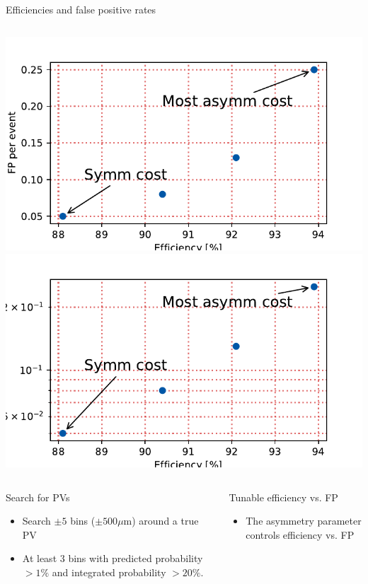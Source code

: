 \begin{frame}{Efficiencies and false positive rates}
\begin{columns}
\includegraphics[width=\textwidth]{images/EffVsFP.pdf}
\includegraphics[width=\textwidth]{images/EffVsFP_semilog.pdf}
\end{columns}

  \begin{columns}
  \begin{block}{Search for PVs}
    \begin{itemize}
    	\item Search $ \pm 5 $ bins ($ \pm 500 \mu $m) around a true PV
    	\item At least 3 bins with predicted probability
    	   $ > 1\% $ and
    	   integrated probability $ > 20\%$.
    \end{itemize}
    \end{block}

    \begin{block}{Tunable efficiency vs. FP}
    \begin{itemize}
        \item The asymmetry parameter controls efficiency vs. FP
    \end{itemize}
  \end{block}
\end{columns}
\end{frame}
